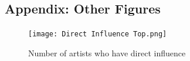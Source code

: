 \documentclass[12pt]{article}  %
\begin{document}
\begin{subappendices}  %

\section{Appendix: Other Figures}

\begin{figure}[htbp]
\centering
\texttt{[image: Direct Influence Top.png]}
\caption{Number of artists who have direct influence}\label{fig:Direct Influence Top}
\end{figure}







\end{subappendices}  
\end{document}
